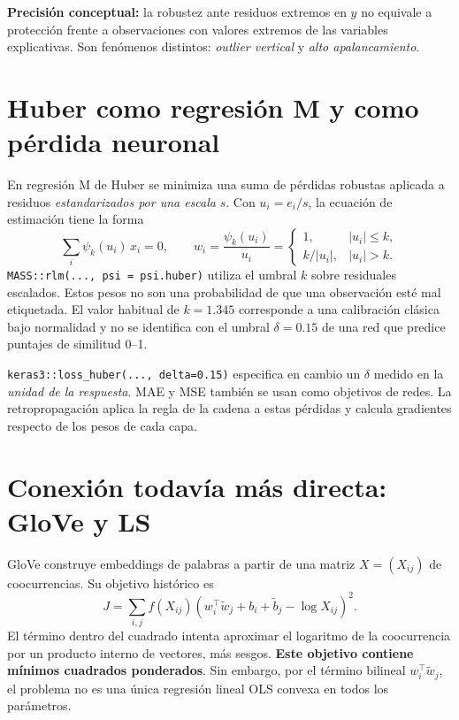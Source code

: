 \documentclass[11pt,a4paper]{article}
\begin{document}
\begin{cuidado}
\textbf{Precisión conceptual:} la robustez ante residuos extremos en \(y\) no equivale a protección frente a observaciones con valores extremos de las variables explicativas. Son fenómenos distintos: \emph{outlier vertical} y \emph{alto apalancamiento}.
\end{cuidado}

\section{Huber como regresión M y como pérdida neuronal}

En regresión M de Huber se minimiza una suma de pérdidas robustas aplicada a residuos \emph{estandarizados por una escala} \(s\). Con \(u_i=e_i/s\), la ecuación de estimación tiene la forma
\[
  \sum_i \psi_k(u_i)\,x_i=0,\qquad
  w_i=\frac{\psi_k(u_i)}{u_i}=
  \begin{cases}
   1,&|u_i|\le k,\\ k/|u_i|,&|u_i|>k.
  \end{cases}
\]
\texttt{MASS::rlm(..., psi = psi.huber)} utiliza el umbral \(k\) sobre residuales escalados. Estos pesos no son una probabilidad de que una observación esté mal etiquetada. El valor habitual de \(k=1.345\) corresponde a una calibración clásica bajo normalidad y no se identifica con el umbral \(\delta=0.15\) de una red que predice puntajes de similitud 0--1.

\texttt{keras3::loss\_huber(..., delta=0.15)} especifica en cambio un \(\delta\) medido en la \emph{unidad de la respuesta}. MAE y MSE también se usan como objetivos de redes. La retropropagación aplica la regla de la cadena a estas pérdidas y calcula gradientes respecto de los pesos de cada capa.

\section{Conexión todavía más directa: GloVe y LS}

GloVe construye embeddings de palabras a partir de una matriz \(X=(X_{ij})\) de coocurrencias. Su objetivo histórico es
\[
 J=\sum_{i,j} f(X_{ij})
 \left(w_i^\top \widetilde w_j+b_i+\widetilde b_j-\log X_{ij}\right)^2.
\]
El término dentro del cuadrado intenta aproximar el logaritmo de la coocurrencia por un producto interno de vectores, más sesgos. \textbf{Este objetivo contiene mínimos cuadrados ponderados}. Sin embargo, por el término bilineal \(w_i^\top\widetilde w_j\), el problema no es una única regresión lineal OLS convexa en todos los parámetros.
\end{document}
